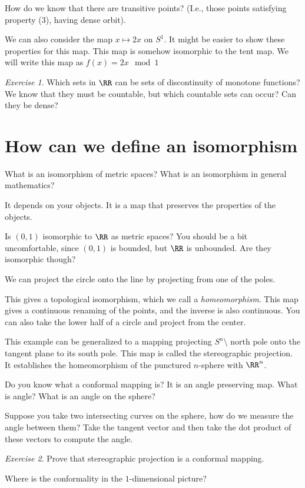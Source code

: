 \documentclass{article}
\theoremstyle{remark}
\newtheorem{exercise}{Exercise}
\begin{document}
How do we know that there are transitive points? (I.e.,
those points satisfying property (3), having dense orbit).

We can also consider the map $x\mapsto 2x$ on $S^1$. It 
might be easier to show these properties for this map.
This map is somehow isomorphic to the tent map.
We will write this map as $f(x) = 2x\mod{1}$

\begin{exercise}
    Which sets in $\RR$ can be sets of discontinuity of 
    monotone functions? We know that they must be countable,
    but which countable sets can occur? Can they be dense?
\end{exercise}

\section{How can we define an isomorphism}

What is an isomorphism of metric spaces? 
What is an isomorphism in general mathematics?

It depends on your objects. 
It is a map that preserves the properties of the objects.

Is $(0,1)$ isomorphic to $\RR$ as metric spaces? 
You should be a bit uncomfortable, since $(0,1)$ is bounded,
but $\RR$ is unbounded. Are they isomorphic though?

We can project the circle onto the line by projecting from
one of the poles.

This gives a topological isomorphism, which we call a 
\emph{homeomorphism}. This map gives a continuous renaming of the 
points, and the inverse is also continuous.
You can also take the lower half of a circle and project
from the center.

This example can be generalized to a mapping
projecting $S^n\setminus {\text{ north pole}}$ onto
the tangent plane to its south pole. This map is called
the stereographic projection. It establishes the homeomorphism
of the punctured $n$-sphere with $\RR^n$.

Do you know what a conformal mapping is? It is an angle 
preserving map. What is angle? What is an angle on the
sphere?

Suppose you take two intersecting curves on the sphere,
how do we measure the angle between them? Take the tangent
vector and then take the dot product of these vectors to
compute the angle.

\begin{exercise}
    Prove that stereographic projection is a conformal mapping.

    Where is the conformality in the $1$-dimensional picture?
\end{exercise}
\end{document}
